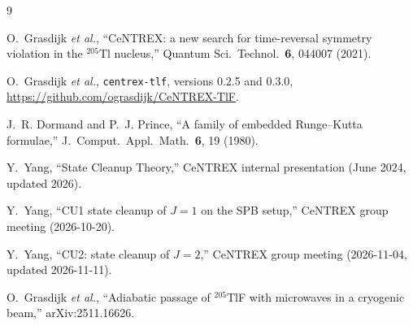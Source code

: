 \documentclass[11pt,a4paper,oneside]{report}
\newcommand{\code}[1]{\texttt{#1}}
\begin{document}
\begingroup
\let\chapter\section   %
\singlespacing\small
\begin{thebibliography}{9}

O.~Grasdijk \emph{et al.}, ``CeNTREX: a new search for time-reversal symmetry violation in the
$^{205}$Tl nucleus,'' Quantum Sci.\ Technol.\ \textbf{6}, 044007 (2021).

O.~Grasdijk \emph{et al.}, \code{centrex-tlf}, versions 0.2.5 and 0.3.0,
\url{https://github.com/ograsdijk/CeNTREX-TlF}.

J.~R. Dormand and P.~J. Prince, ``A family of embedded Runge--Kutta formulae,'' J.\ Comput.\ Appl.\
Math.\ \textbf{6}, 19 (1980).

Y.~Yang, ``State Cleanup Theory,'' CeNTREX internal presentation (June 2024, updated 2026).

Y.~Yang, ``CU1 state cleanup of $J=1$ on the SPB setup,'' CeNTREX group meeting (2026-10-20).

Y.~Yang, ``CU2: state cleanup of $J=2$,'' CeNTREX group meeting (2026-11-04, updated 2026-11-11).

O.~Grasdijk \emph{et al.}, ``Adiabatic passage of $^{205}$TlF with microwaves in a cryogenic beam,''
arXiv:2511.16626.

\end{thebibliography}
\endgroup
\end{document}
